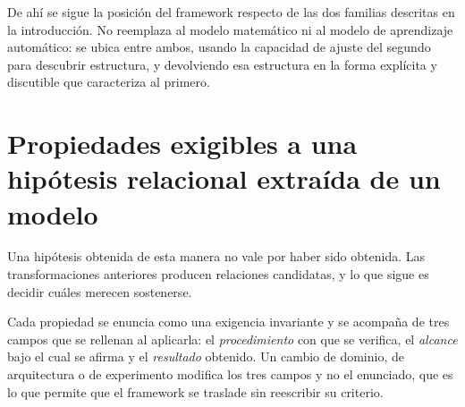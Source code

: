 De ahí se sigue la posición del framework respecto de las dos familias descritas en la introducción. No reemplaza al modelo matemático ni al modelo de aprendizaje automático: se ubica entre ambos, usando la capacidad de ajuste del segundo para descubrir estructura, y devolviendo esa estructura en la forma explícita y discutible que caracteriza al primero.

\section{Propiedades exigibles a una hipótesis relacional extraída de un modelo}
\label{sec:criterio}

Una hipótesis obtenida de esta manera no vale por haber sido obtenida. Las transformaciones anteriores producen relaciones candidatas, y lo que sigue es decidir cuáles merecen sostenerse. 

Cada propiedad se enuncia como una exigencia invariante y se acompaña de tres campos que se rellenan al aplicarla: el \emph{procedimiento} con que se verifica, el \emph{alcance} bajo el cual se afirma y el \emph{resultado} obtenido. Un cambio de dominio, de arquitectura o de experimento modifica los tres campos y no el enunciado, que es lo que permite que el framework se traslade sin reescribir su criterio.

